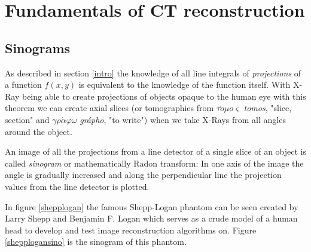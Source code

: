 \section{Fundamentals of CT reconstruction}
\subsection{Sinograms}
\par As described in section \ref{intro} the knowledge of all line integrals of \emph{projections} of a function \(f(x,y)\) is equivalent to the knowledge of the function itself. With X-Ray being able to create projections of objects opaque to the human eye with this theorem we can create axial slices (or tomographies from \(\tau\acute{o}\mu o\varsigma\) \emph{tomos}, "slice, section" and \(\gamma\rho\acute{\alpha}\varphi\omega\) \emph{gr\'aph\=o}, "to write"\cite{wiktionaryTomography}\cite{wiktionaryTomo}\cite{wiktionaryGraphy}) when we take X-Rays from all angles around the object.
\par An image of all the projections from a line detector of a single slice of an object is called \emph{sinogram} or mathematically Radon transform: In one axis of the image the angle is gradually increased and along the perpendicular line the projection values from the line detector is plotted.
\par In figure \ref{shepplogan} the famous Shepp-Logan phantom can be seen created by Larry Shepp and Benjamin F. Logan which serves as a crude model of a human head to develop and test image reconstruction algorithms on. Figure \ref{shepplogansino} is the sinogram of this phantom.\cite{shepploganphantom}
